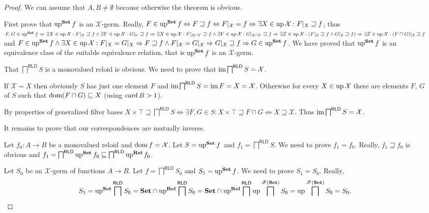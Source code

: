 \begin{proof}
  We can assume that $A, B \neq \emptyset$ because otherwise the theorem is
  obvious.
  
  First prove that $\operatorname{up}^{\mathbf{Set}} f$ is an
  $\mathcal{X}$-germ. Really, $F \in \operatorname{up}^{\mathbf{Set}} f
  \Leftrightarrow F \sqsupseteq f \Leftrightarrow F|_{\mathcal{X}} = f
  \Leftrightarrow \exists X \in \operatorname{up} \mathcal{X} : F|_X \sqsupseteq f$;
  thus $F, G \in \operatorname{up}^{\mathbf{Set}} f \Rightarrow \exists X \in
  \operatorname{up} \mathcal{X} : F|_X \sqsupseteq f \wedge \exists Y \in \operatorname{up}
  \mathcal{X} : G|_Y \sqsupseteq f \Rightarrow \exists X \in \operatorname{up}
  \mathcal{X} : F|_{X \cap Y} \sqsupseteq f \wedge \exists Y \in \operatorname{up}
  \mathcal{X} : G|_{X \cap Y} \sqsupseteq f \Rightarrow \exists Z \in
  \operatorname{up} \mathcal{X} : (F|_Z \sqsupseteq f \wedge G|_Z \sqsupseteq f)
  \Rightarrow \exists Z \in \operatorname{up} \mathcal{X} : (F \sqcap G) |_Z
  \sqsupseteq f$ and $F \in \operatorname{up}^{\mathbf{Set}} f \wedge \exists
  X \in \operatorname{up} \mathcal{X} : F|_X = G|_X \Rightarrow F \sqsupseteq f \wedge
  F|_{\mathcal{X}} = G|_{\mathcal{X}} \Rightarrow G|_{\mathcal{X}} \sqsupseteq
  f \Rightarrow G \in \operatorname{up}^{\mathbf{Set}} f$. We have proved
  that $\operatorname{up}^{\mathbf{Set}} f$ is an equivalence class of the
  suitable equivalence relation, that is $\operatorname{up}^{\mathbf{Set}} f$
  is an $\mathcal{X}$-germ.
  
  That $\bigsqcap^{\mathsf{RLD}} S$ is a monovalued reloid is obvious.
  We need to prove that $\operatorname{im} \bigsqcap^{\mathsf{RLD}} S =
  \mathcal{X}$.
  
  If $\mathcal{X} = X$ then obviously $S$ has just one element $F$ and
  $\operatorname{im} \bigsqcap^{\mathsf{RLD}} S = \operatorname{im} F = X =
  \mathcal{X}$. Otherwise for every $X \in \operatorname{up} \mathcal{X}$ there are
  elements $F$, $G$ of $S$ such that $\operatorname{dom} (F \sqcap G) \sqsubseteq X$
  (using $\operatorname{card} B > 1$).
  
  By properties of generalized filter bases $X \times \top \sqsupseteq
  \bigsqcap^{\mathsf{RLD}} S \Leftrightarrow \exists F, G \in S : X
  \times \top \sqsupseteq F \sqcap G \Leftrightarrow X \sqsupseteq
  \mathcal{X}$. Thus $\operatorname{im} \bigsqcap^{\mathsf{RLD}} S =
  \mathcal{X}$.
  
  It remains to prove that our correspondences are mutually inverse.
  
  Let $f_0 : A \rightarrow B$ be a monovalued reloid and $\operatorname{dom} f =
  \mathcal{X}$. Let $S = \operatorname{up}^{\mathbf{Set}} f$ and $f_1 =
  \bigsqcap^{\mathsf{RLD}} S$. We need to prove $f_1 = f_0$. Really,
  $f_1 \sqsupseteq f_0$ is obvious and $f_1 = \bigsqcap^{\mathsf{RLD}}
  \operatorname{up}^{\mathbf{Set}} f_0 \sqsubseteq
  \bigsqcap^{\mathsf{RLD}} \operatorname{up}^{\mathbf{Rel}} f_0$.
  
  Let $S_0$ be an $\mathcal{X}$-germ of functions $A \rightarrow B$. Let $f =
  \bigsqcap^{\mathsf{RLD}} S_0$ and $S_1 =
  \operatorname{up}^{\mathbf{Set}} f$. We need to prove $S_1 = S_0$. Really,
  \[ S_1 = \operatorname{up}^{\mathbf{Set}}  \bigsqcap^{\mathsf{RLD}}
     S_0 = \mathbf{Set} \cap \operatorname{up}^{\mathbf{Rel}} 
     \bigsqcap^{\mathsf{RLD}} S_0 = \mathbf{Set} \cap
     \operatorname{up}^{\mathbf{Rel}}  \bigsqcap^{\mathsf{RLD}}
     \operatorname{up} \bigsqcap^{\mathscr{F} (\mathbf{Set})} S_0 = \operatorname{up}
     \bigsqcap^{\mathscr{F} (\mathbf{Set})} S_0 = S_0 . \]
\end{proof}

